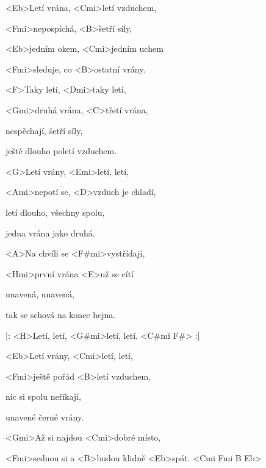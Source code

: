 

\zs
<Eb>Letí vrána, <Cmi>letí vzduchem,

<Fmi>nepospíchá, <B>šetří síly,

<Eb>jedním okem, <Cmi>jedním uchem

<Fmi>sleduje, co <B>ostatní vrány.
\ks

\zs
<F>Taky letí, <Dmi>taky letí,

<Gmi>druhá vrána, <C>třetí vrána,

nespěchají, šetří síly,

ještě dlouho poletí vzduchem.
\ks

\zs
<G>Letí vrány, <Emi>letí, letí,

<Ami>nepotí se, <D>vzduch je chladí,

letí dlouho, všechny spolu,

jedna vrána jako druhá.
\ks

\zs
<A>Na chvíli se <F#mi>vystřídají,

<Hmi>první vrána <E>už se cítí

unavená, unavená,

tak se schová na konec hejna.
\ks

\zr
|: <H>Letí, letí, <G#mi>letí, letí. <C#mi F#> :|
\kr

\zs
<Eb>Letí vrány, <Cmi>letí, letí,

<Fmi>ještě pořád <B>letí vzduchem,

nic si spolu neříkají,

unavené černé vrány.
\ks

\hvezda
<Gmi>Až si najdou <Cmi>dobré místo,

<Fmi>sednou si a <B>budou klidně <Eb>spát. <Cmi Fmi B Eb>
\kr

\kp

